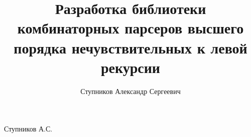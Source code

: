 \documentclass[times]{itmo-student-thesis}
\begin{document}
\title{Разработка библиотеки комбинаторных парсеров высшего порядка нечувствительных к левой рекурсии}
\author{Ступников Александр Сергеевич}{Ступников А.С.}





\startdefinitionspage
\end{document}
